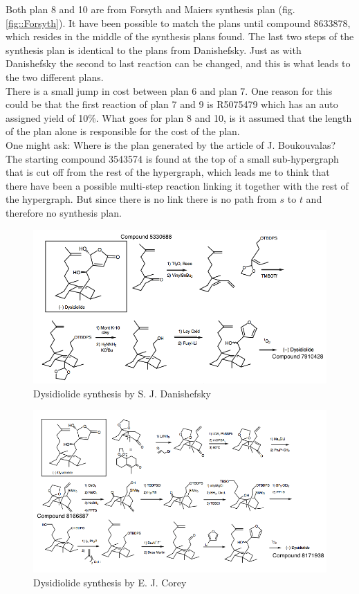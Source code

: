 \documentclass[a4paper,10pt,titlepage]{paper}
\begin{document}
Both plan 8 and 10 are from Forsyth and Maiers synthesis plan (fig. \ref{fig::Forsyth}). It have been possible to match the plans until compound 8633878, which resides in the middle of the synthesis plans found. The last two steps of the synthesis plan is identical to the plans from Danishefsky. Just as with Danishefsky the second to last reaction can be changed, and this is what leads to the two different plans.\\

There is a small jump in cost between plan 6 and plan 7. One reason for this could be that the first reaction of plan 7 and 9 is R5075479 which has an auto assigned yield of 10\%. What goes for plan 8 and 10, is it assumed that the length of the plan alone is responsible for the cost of the plan.\\ 
One might ask: Where is the plan generated by the article of J. Boukouvalas? The starting compound 3543574 is 
found at the top of a small sub-hypergraph that is cut off from the rest of the hypergraph, which leads me to think that there have been a possible multi-step reaction linking it together with the rest of the hypergraph. But since there is no link there is no path from $s$ to $t$ and therefore no synthesis plan.
\begin{figure}
\centering
\includegraphics[scale=0.5, angle=90]{Synteseplaner/Dysidiolide/Danishefsky.png}
\caption{Dysidiolide synthesis by S. J. Danishefsky \cite{SynthesisPlans}}
\label{fig::Danishefsky}
\end{figure}

\begin{figure}
\centering
\includegraphics[scale=0.5, angle=90]{Synteseplaner/Dysidiolide/Corey.png}
\caption{Dysidiolide synthesis by E. J. Corey  \cite{SynthesisPlans}}
\label{fig::Corey}
\end{figure}
\end{document}
